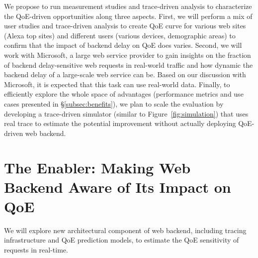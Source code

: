 We propose to run measurement studies and trace-driven analysis to characterize the QoE-driven opportunities along three aspects.
First, we will perform a mix of user studies and trace-driven analysis to create QoE curve for various web sites (\eg Alexa top sites) and different users (\eg various devices, demographic areas) to confirm that the impact of backend delay on QoE does varies.
Second, we will work with Microsoft, a large web service provider to gain insights on the fraction of backend delay-sensitive web requests in real-world traffic and how dynamic the backend delay of a large-scale web service can be.
Based on our discussion with Microsoft, it is expected that this task can use real-world data.
Finally, to efficiently explore the whole space of advantages (performance metrics and use cases presented in \S\ref{subsec:benefits}), we plan to scale the evaluation by developing a trace-driven simulator (similar to Figure~\ref{fig:simulation}) that uses real trace to estimate the potential improvement without actually deploying QoE-driven web backend.






\section{The Enabler: Making Web Backend Aware of Its Impact on QoE}
\label{sec:enabler}
\begin{task}
We will explore new architectural component of web backend, including tracing infrastructure and QoE prediction models, to estimate the QoE sensitivity of requests in real-time.
\end{task}


